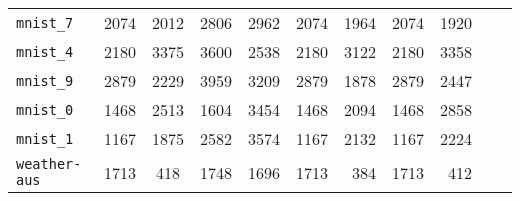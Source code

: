 \begin{tabular}{lccrrrrrrrr}
\texttt{mnist\_7} & 2074 & 2012 & 2806 & 2962 & 2074 & 1964 & 2074 & 1920\\
\texttt{mnist\_4} & 2180 & 3375 & 3600 & 2538 & 2180 & 3122 & 2180 & 3358\\
\texttt{mnist\_9} & 2879 & 2229 & 3959 & 3209 & 2879 & 1878 & 2879 & 2447\\
\texttt{mnist\_0} & 1468 & 2513 & 1604 & 3454 & 1468 & 2094 & 1468 & 2858\\
\texttt{mnist\_1} & 1167 & 1875 & 2582 & 3574 & 1167 & 2132 & 1167 & 2224\\
\texttt{weather-aus} & 1713 & 418 & 1748 & 1696 & 1713 & 384 & 1713 & 412\\
\bottomrule
\end{tabular}
